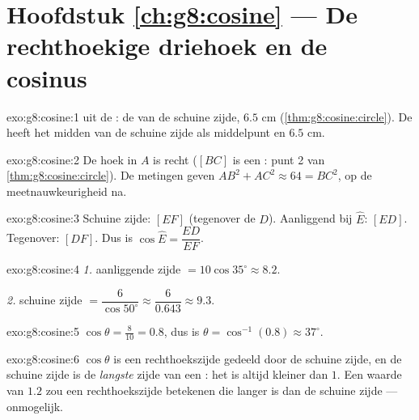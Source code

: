 \section*{Hoofdstuk \ref{ch:g8:cosine} --- De rechthoekige driehoek en de cosinus}

\begin{solution}{exo:g8:cosine:1}
 uit de : de  van de schuine zijde, $6.5$ cm
(\cref{thm:g8:cosine:circle}). De  heeft het midden van de
schuine zijde als middelpunt en  $6.5$ cm.
\end{solution}

\begin{solution}{exo:g8:cosine:2}
De hoek in $A$ is recht ($[BC]$ is een : punt 2 van
\cref{thm:g8:cosine:circle}). De metingen geven $AB^2 + AC^2 \approx 64 = BC^2$,
op de meetnauwkeurigheid na.
\end{solution}

\begin{solution}{exo:g8:cosine:3}
Schuine zijde: $[EF]$ (tegenover de  $D$). Aanliggend bij
$\widehat E$: $[ED]$. Tegenover: $[DF]$. Dus is
$\cos\widehat E = \dfrac{ED}{EF}$.
\end{solution}

\begin{solution}{exo:g8:cosine:4}
\emph{1.} aanliggende zijde $= 10 \cos 35^\circ \approx 8.2$.

\emph{2.} schuine zijde $= \dfrac{6}{\cos 50^\circ} \approx
\dfrac{6}{0.643} \approx 9.3$.
\end{solution}

\begin{solution}{exo:g8:cosine:5}
$\cos\theta = \frac{8}{10} = 0.8$, dus is
$\theta = \cos^{-1}(0.8) \approx 37^\circ$.
\end{solution}

\begin{solution}{exo:g8:cosine:6}
$\cos\theta$ is een rechthoekszijde gedeeld door de schuine zijde, en de schuine
zijde is de \emph{langste} zijde van een : het  is
altijd kleiner dan $1$. Een waarde van $1.2$ zou een rechthoekszijde betekenen
die langer is dan de schuine zijde --- onmogelijk.
\end{solution}


